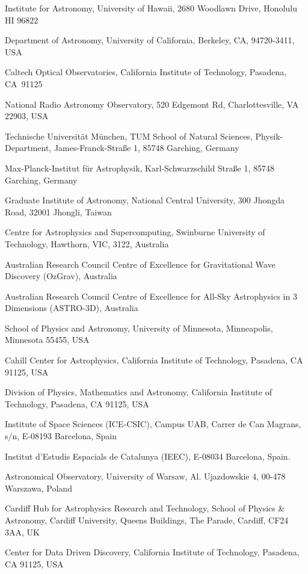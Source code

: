 \documentclass{nature_plusfigure}
\begin{document}
\begin{small}
\begin{affiliations}
\item Institute for Astronomy, University of Hawaii, 2680 Woodlawn Drive, Honolulu HI 96822
\item Department of Astronomy, University of California, Berkeley, CA, 94720-3411, USA 
\item Caltech Optical Observatories, California Institute of Technology, Pasadena, CA 91125
\item National Radio Astronomy Observatory, 520 Edgemont Rd, Charlottesville, VA 22903, USA
\item Technische Universit{\"a}t M{\"u}nchen, TUM School of Natural Sciences, Physik-Department, James-Franck-Stra{\ss}e 1, 85748 Garching, Germany
\item Max-Planck-Institut f{\"u}r Astrophysik, Karl-Schwarzschild Stra{\ss}e 1, 85748 Garching, Germany
\item Graduate Institute of Astronomy, National Central University, 300 Jhongda Road, 32001 Jhongli, Taiwan
\item Centre for Astrophysics and Supercomputing, Swinburne University of Technology, Hawthorn, VIC, 3122, Australia
\item Australian Research Council Centre of Excellence for Gravitational Wave Discovery (OzGrav), Australia
\item Australian Research Council Centre of Excellence for All-Sky Astrophysics in 3 Dimensions (ASTRO-3D), Australia
\item School of Physics and Astronomy, University of Minnesota, Minneapolis, Minnesota 55455, USA
\item Cahill Center for Astrophysics, California Institute of Technology, Pasadena, CA 91125, USA
\item Division of Physics, Mathematics and Astronomy, California Institute of Technology, Pasadena, CA 91125, USA
\item Institute of Space Sciences (ICE-CSIC), Campus UAB, Carrer de Can Magrans, s/n, E-08193 Barcelona, Spain
\item Institut d’Estudis Espacials de Catalunya (IEEC), E-08034 Barcelona, Spain.
\item Astronomical Observatory, University of Warsaw, Al. Ujazdowskie 4, 00-478 Warszawa, Poland
\item Cardiff Hub for Astrophysics Research and Technology, School of Physics \& Astronomy, Cardiff University, Queens Buildings, The Parade, Cardiff, CF24 3AA, UK
\item Center for Data Driven Discovery, California Institute of Technology, Pasadena, CA 91125, USA

\end{affiliations}
\end{small}
\end{document}
